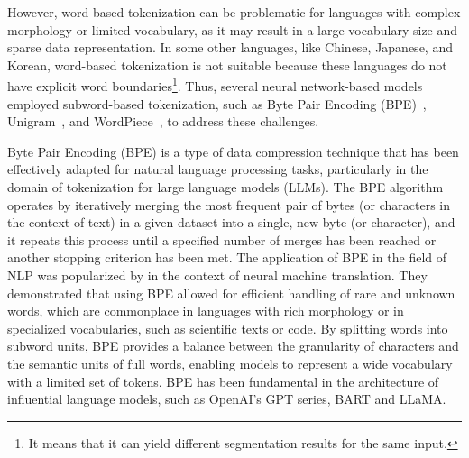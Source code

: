 However, word-based tokenization can be problematic for languages with complex morphology or limited vocabulary, as it may result in a large vocabulary size and sparse data representation.
In some other languages, like Chinese, Japanese, and Korean, word-based tokenization is not suitable because these languages do not have explicit word boundaries\footnote{It means that it can yield different segmentation results for the same input.}.
Thus, several neural network-based models employed subword-based tokenization, such as Byte Pair Encoding (BPE)~\cite{sennrich2016neural}, Unigram~\cite{kudo2018sentencepiece}, and WordPiece~\cite{wu2016google}, to address these challenges.

Byte Pair Encoding (BPE) is a type of data compression technique that has been effectively adapted for natural language processing tasks, particularly in the domain of tokenization for large language models (LLMs).
The BPE algorithm operates by iteratively merging the most frequent pair of bytes (or characters in the context of text) in a given dataset into a single, new byte (or character), and it repeats this process until a specified number of merges has been reached or another stopping criterion has been met.
The application of BPE in the field of NLP was popularized by \textcite{sennrich2016neural} in the context of neural machine translation.
They demonstrated that using BPE allowed for efficient handling of rare and unknown words, which are commonplace in languages with rich morphology or in specialized vocabularies, such as scientific texts or code.
By splitting words into subword units, BPE provides a balance between the granularity of characters and the semantic units of full words, enabling models to represent a wide vocabulary with a limited set of tokens.
BPE has been fundamental in the architecture of influential language models, such as OpenAI's GPT series, BART and LLaMA\@.

